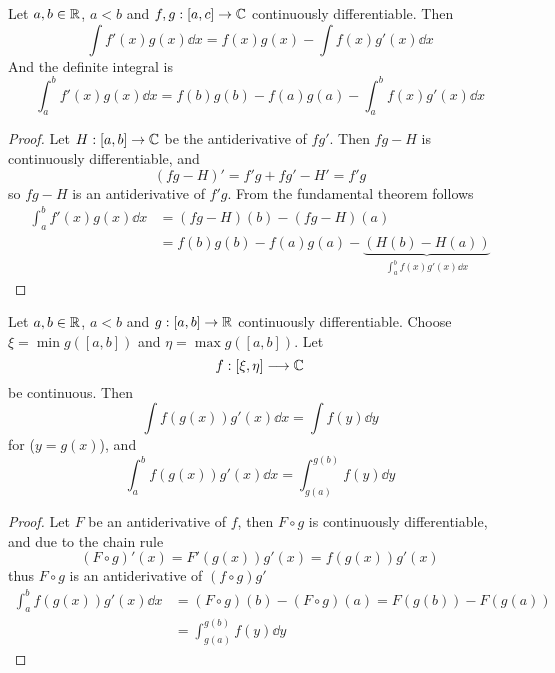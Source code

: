 \documentclass[../../script.tex]{subfiles}
\begin{document}
\begin{cor}
    Let $a, b \in \mathbb{R}$, $a < b$ and $f, g: [a, c] \rightarrow \mathbb{C}$ continuously differentiable. Then 
    \[
        \int f'(x) g(x) \dd x = f(x) g(x) - \int f(x) g'(x) \dd x
    \]
    And the definite integral is 
    \[
        \int_a^b f'(x) g(x) \dd x = f(b)g(b) - f(a)g(a) - \int_a^b f(x)g'(x) \dd x
    \]
\end{cor}
\begin{proof}
    Let $H: [a, b] \rightarrow \mathbb{C}$ be the antiderivative of $fg'$. Then $fg - H$ is continuously differentiable, and 
    \begin{equation}
        (fg - H)' = f'g + fg' - H' = f'g
    \end{equation}
    so $fg - H$ is an antiderivative of $f'g$. From the fundamental theorem follows 
    \begin{equation}
        \begin{split}
            \int_a^b f'(x) g(x) \dd x &= (fg - H)(b) - (fg - H)(a) \\
            &= f(b)g(b) - f(a)g(a) - \underbrace{(H(b) - H(a))}_{\int_a^b f(x)g'(x) \dd x}
        \end{split}
    \end{equation}
\end{proof}

\begin{cor}[Substitution]
    Let $a, b \in \mathbb{R}$, $a < b$ and $g: [a, b] \rightarrow \mathbb{R}$ continuously differentiable. 
    Choose $\xi = \min g([a, b])$ and $\eta = \max g([a, b])$. 
    Let 
    \[
        f: [\xi, \eta] \longrightarrow \mathbb{C}
    \]
    be continuous. Then 
    \[
        \int f(g(x)) g'(x) \dd x = \int f(y) \dd y
    \]
    for ($y = g(x)$), and 
    \[
        \int_a^b f(g(x)) g'(x) \dd x = \int_{g(a)}^{g(b)} f(y) \dd y
    \]
\end{cor}
\begin{proof}
    Let $F$ be an antiderivative of $f$, then $F \circ g$ is continuously differentiable, and due to the chain rule
    \begin{equation}
        (F \circ g)'(x) = F'(g(x)) g'(x) = f(g(x)) g'(x)
    \end{equation}
    thus $F \circ g$ is an antiderivative of $(f \circ g)g'$
    \begin{equation}
        \begin{split}
            \int_a^b f(g(x)) g'(x) \dd x &= (F \circ g)(b) - (F \circ g)(a) = F(g(b)) - F(g(a)) \\
            &= \int_{g(a)}^{g(b)} f(y) \dd y
        \end{split}
    \end{equation}
\end{proof}
\end{document}
